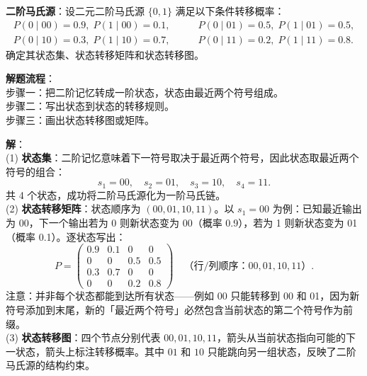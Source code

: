 \begin{example}
\label{ex:second-order}
\textbf{二阶马氏源}：设二元二阶马氏源 $\{0,1\}$ 满足以下条件转移概率：
\begin{align*}
P(0\mid 00)=0.9,\; P(1\mid 00)=0.1,&\qquad P(0\mid 01)=0.5,\; P(1\mid 01)=0.5,\\
P(0\mid 10)=0.3,\; P(1\mid 10)=0.7,&\qquad P(0\mid 11)=0.2,\; P(1\mid 11)=0.8.
\end{align*}
确定其状态集、状态转移矩阵和状态转移图。

\noindent \textbf{解题流程}：\\[2pt]
步骤一：把二阶记忆转成一阶状态，状态由最近两个符号组成。\\
步骤二：写出状态到状态的转移规则。\\
步骤三：画出状态转移图或矩阵。

\noindent \textbf{解}：\\[2pt]
(1) \textbf{状态集}：二阶记忆意味着下一符号取决于最近两个符号，因此状态取最近两个符号的组合：
\[
s_1=00,\quad s_2=01,\quad s_3=10,\quad s_4=11.
\]
共 4 个状态，成功将二阶马氏源化为一阶马氏链。\\[4pt]
(2) \textbf{状态转移矩阵}：状态顺序为 $(00,01,10,11)$。以 $s_1=00$ 为例：已知最近输出为 00，下一个输出若为 0 则新状态变为 00（概率 0.9），若为 1 则新状态变为 01（概率 0.1）。逐状态写出：
\[
P=\begin{pmatrix}
0.9  & 0.1  & 0    & 0    \\
0    & 0    & 0.5  & 0.5  \\
0.3  & 0.7  & 0    & 0    \\
0    & 0    & 0.2  & 0.8
\end{pmatrix}
\quad\text{（行/列顺序：}00,01,10,11\text{）}.
\]
注意：并非每个状态都能到达所有状态——例如 00 只能转移到 00 和 01，因为新符号添加到末尾，新的「最近两个符号」必然包含当前状态的第二个符号作为前缀。\\[4pt]
(3) \textbf{状态转移图}：四个节点分别代表 $00,01,10,11$，箭头从当前状态指向可能的下一状态，箭头上标注转移概率。其中 $01$ 和 $10$ 只能跳向另一组状态，反映了二阶马氏源的结构约束。
\end{example}

